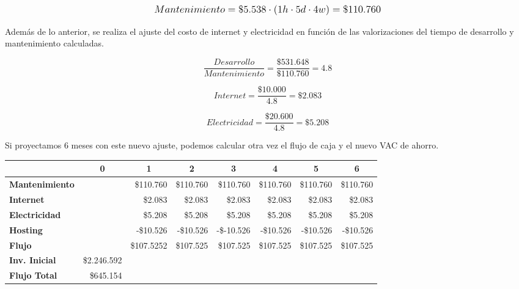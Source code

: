 \[
\mathlarger{
	Mantenimiento = \$5.538 \cdot \left(1h\cdot5d\cdot4w\right) = \$110.760
}
\]

Además de lo anterior, se realiza el ajuste del costo de internet y electricidad en función de las valorizaciones del tiempo de desarrollo y mantenimiento calculadas.

\[
\frac{Desarrollo}{Mantenimiento} = \frac{\$531.648}{\$110.760} = 4.8
\]

\[
Internet = \frac{\$10.000}{4.8} = \$2.083
\]

\[
Electricidad = \frac{\$20.600}{4.8} = \$5.208
\]

Si proyectamos 6 meses con este nuevo ajuste, podemos calcular otra vez el flujo de caja y el nuevo VAC de ahorro.

\begin{center}
	\begin{tabular}{ | l | l | l | l | l | l | l | l |}
		\hline
		& \multicolumn{1}{|c|}{\textbf{0}} & \multicolumn{1}{|c|}{\textbf{1}} & \multicolumn{1}{|c|}{\textbf{2}} & \multicolumn{1}{|c|}{\textbf{3}} & \multicolumn{1}{|c|}{\textbf{4}} & \multicolumn{1}{|c|}{\textbf{5}} & \multicolumn{1}{|c|}{\textbf{6}} \\
		\hline
		{\textbf{Mantenimiento}} &  & \multicolumn{1}{|r|}{\$110.760} & \multicolumn{1}{|r|}{\$110.760} & \multicolumn{1}{|r|}{\$110.760} & \multicolumn{1}{|r|}{\$110.760} & \multicolumn{1}{|r|}{\$110.760} & \multicolumn{1}{|r|}{\$110.760} \\ \hline
		
		{\textbf{Internet}} &  & \multicolumn{1}{|r|}{\$2.083} & \multicolumn{1}{|r|}{\$2.083} & \multicolumn{1}{|r|}{\$2.083} & \multicolumn{1}{|r|}{\$2.083} & \multicolumn{1}{|r|}{\$2.083} & \multicolumn{1}{|r|}{\$2.083} \\ \hline
		
		{\textbf{Electricidad}} &  & \multicolumn{1}{|r|}{\$5.208} & \multicolumn{1}{|r|}{\$5.208} & \multicolumn{1}{|r|}{\$5.208} & \multicolumn{1}{|r|}{\$5.208} & \multicolumn{1}{|r|}{\$5.208} & \multicolumn{1}{|r|}{\$5.208} \\ \hline
		
		{\textbf{Hosting}} &  & \multicolumn{1}{|r|}{-\$10.526} & \multicolumn{1}{|r|}{-\$10.526} & \multicolumn{1}{|r|}{-\$-10.526} & \multicolumn{1}{|r|}{-\$10.526} & \multicolumn{1}{|r|}{-\$10.526} & \multicolumn{1}{|r|}{-\$10.526} \\ \hline
		
		{\textbf{Flujo}} &  & \multicolumn{1}{|r|}{\$107.5252} & \multicolumn{1}{|r|}{\$107.525} & \multicolumn{1}{|r|}{\$107.525} & \multicolumn{1}{|r|}{\$107.525} & \multicolumn{1}{|r|}{\$107.525} & \multicolumn{1}{|r|}{\$107.525} \\ \hline
		{\textbf{Inv. Inicial}} & \multicolumn{1}{|r|}{\$2.246.592} & & & & & & \\ \hline
		\textbf{Flujo Total} & \multicolumn{1}{|r|}{\$645.154} & & & & & & \\ \hline
	\end{tabular}
\end{center}

